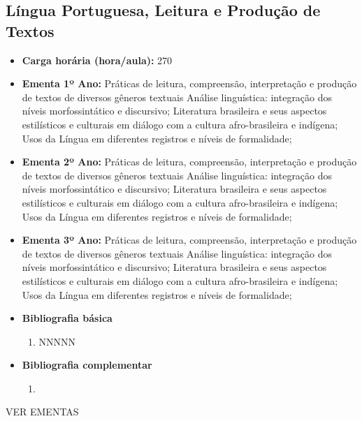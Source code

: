 \documentclass[11pt,fleqn]{book} %
\newcommand{\VER}[1]{\begingroup\color{red}#1\endgroup}
\begin{document}
\subsection{Língua Portuguesa, Leitura e Produção de Textos}\label{disc:linguaportuguesa}
\begin{itemize}
	\item \textbf{Carga horária (hora/aula):} 270
	\item \textbf{Ementa 1º Ano:} 
	Práticas de leitura, compreensão, interpretação e produção de textos de diversos gêneros textuais
	Análise linguística: integração dos níveis morfossintático e discursivo;
	Literatura brasileira e seus aspectos estilísticos e culturais em diálogo com a cultura afro-brasileira e indígena;
	Usos da Língua em diferentes registros e níveis de formalidade;

	\item \textbf{Ementa 2º Ano:} 
	Práticas de leitura, compreensão, interpretação e produção de textos de diversos gêneros textuais
	Análise linguística: integração dos níveis morfossintático e discursivo;
	Literatura brasileira e seus aspectos estilísticos e culturais em diálogo com a cultura afro-brasileira e indígena;
	Usos da Língua em diferentes registros e níveis de formalidade;

	\item \textbf{Ementa 3º Ano:} 
	Práticas de leitura, compreensão, interpretação e produção de textos de diversos gêneros textuais
	Análise linguística: integração dos níveis morfossintático e discursivo;
	Literatura brasileira e seus aspectos estilísticos e culturais em diálogo com a cultura afro-brasileira e indígena;
	Usos da Língua em diferentes registros e níveis de formalidade;	
	
	\item \textbf{Bibliografia básica}
	\begin{enumerate}
		\item NNNNN
	\end{enumerate}
	\item \textbf{Bibliografia complementar}
	\begin{enumerate}
		\item 
	\end{enumerate}	
\end{itemize}
\VER{VER EMENTAS}
\end{document}
